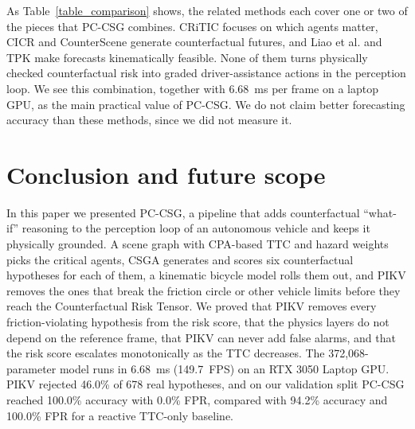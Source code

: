 \documentclass[preprint,12pt]{elsarticle}
\begin{document}
As Table~\ref{table_comparison} shows, the related methods each cover one or two of the pieces that PC-CSG combines. CRiTIC \cite{ahmadi2025critic} focuses on which agents matter, CICR \cite{han2025cicr} and CounterScene \cite{jing2026counterscene} generate counterfactual futures, and Liao et al. \cite{liao2024physics} and TPK \cite{baden2025tpk} make forecasts kinematically feasible. None of them turns physically checked counterfactual risk into graded driver-assistance actions in the perception loop. We see this combination, together with 6.68~ms per frame on a laptop GPU, as the main practical value of PC-CSG. We do not claim better forecasting accuracy than these methods, since we did not measure it.

\section{Conclusion and future scope} \label{section5}
In this paper we presented PC-CSG, a pipeline that adds counterfactual ``what-if'' reasoning to the perception loop of an autonomous vehicle and keeps it physically grounded. A scene graph with CPA-based TTC and hazard weights picks the critical agents, CSGA generates and scores six counterfactual hypotheses for each of them, a kinematic bicycle model rolls them out, and PIKV removes the ones that break the friction circle or other vehicle limits before they reach the Counterfactual Risk Tensor. We proved that PIKV removes every friction-violating hypothesis from the risk score, that the physics layers do not depend on the reference frame, that PIKV can never add false alarms, and that the risk score escalates monotonically as the TTC decreases. The 372,068-parameter model runs in 6.68~ms (149.7~FPS) on an RTX 3050 Laptop GPU. PIKV rejected 46.0\% of 678 real hypotheses, and on our validation split PC-CSG reached 100.0\% accuracy with 0.0\% FPR, compared with 94.2\% accuracy and 100.0\% FPR for a reactive TTC-only baseline.
\end{document}
